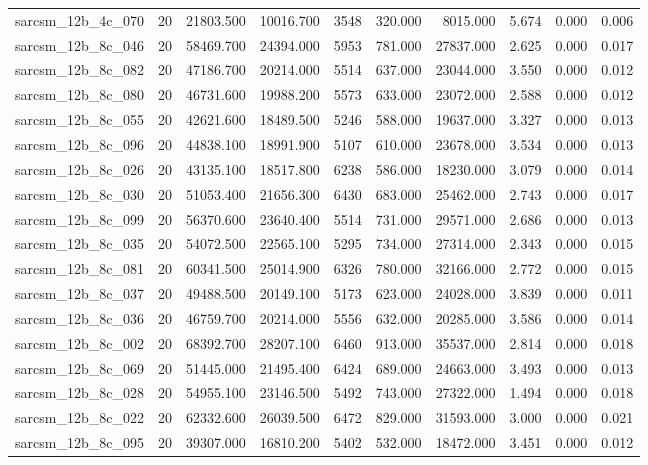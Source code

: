 \begin{tabular}{lrrrrrrrrr}
sarcsm\_12b\_4c\_070 & 20 & 21803.500 & 10016.700 & 3548 & 320.000 & 8015.000 & 5.674 & 0.000 & 0.006 \\
sarcsm\_12b\_8c\_046 & 20 & 58469.700 & 24394.000 & 5953 & 781.000 & 27837.000 & 2.625 & 0.000 & 0.017 \\
sarcsm\_12b\_8c\_082 & 20 & 47186.700 & 20214.000 & 5514 & 637.000 & 23044.000 & 3.550 & 0.000 & 0.012 \\
sarcsm\_12b\_8c\_080 & 20 & 46731.600 & 19988.200 & 5573 & 633.000 & 23072.000 & 2.588 & 0.000 & 0.012 \\
sarcsm\_12b\_8c\_055 & 20 & 42621.600 & 18489.500 & 5246 & 588.000 & 19637.000 & 3.327 & 0.000 & 0.013 \\
sarcsm\_12b\_8c\_096 & 20 & 44838.100 & 18991.900 & 5107 & 610.000 & 23678.000 & 3.534 & 0.000 & 0.013 \\
sarcsm\_12b\_8c\_026 & 20 & 43135.100 & 18517.800 & 6238 & 586.000 & 18230.000 & 3.079 & 0.000 & 0.014 \\
sarcsm\_12b\_8c\_030 & 20 & 51053.400 & 21656.300 & 6430 & 683.000 & 25462.000 & 2.743 & 0.000 & 0.017 \\
sarcsm\_12b\_8c\_099 & 20 & 56370.600 & 23640.400 & 5514 & 731.000 & 29571.000 & 2.686 & 0.000 & 0.013 \\
sarcsm\_12b\_8c\_035 & 20 & 54072.500 & 22565.100 & 5295 & 734.000 & 27314.000 & 2.343 & 0.000 & 0.015 \\
sarcsm\_12b\_8c\_081 & 20 & 60341.500 & 25014.900 & 6326 & 780.000 & 32166.000 & 2.772 & 0.000 & 0.015 \\
sarcsm\_12b\_8c\_037 & 20 & 49488.500 & 20149.100 & 5173 & 623.000 & 24028.000 & 3.839 & 0.000 & 0.011 \\
sarcsm\_12b\_8c\_036 & 20 & 46759.700 & 20214.000 & 5556 & 632.000 & 20285.000 & 3.586 & 0.000 & 0.014 \\
sarcsm\_12b\_8c\_002 & 20 & 68392.700 & 28207.100 & 6460 & 913.000 & 35537.000 & 2.814 & 0.000 & 0.018 \\
sarcsm\_12b\_8c\_069 & 20 & 51445.000 & 21495.400 & 6424 & 689.000 & 24663.000 & 3.493 & 0.000 & 0.013 \\
sarcsm\_12b\_8c\_028 & 20 & 54955.100 & 23146.500 & 5492 & 743.000 & 27322.000 & 1.494 & 0.000 & 0.018 \\
sarcsm\_12b\_8c\_022 & 20 & 62332.600 & 26039.500 & 6472 & 829.000 & 31593.000 & 3.000 & 0.000 & 0.021 \\
sarcsm\_12b\_8c\_095 & 20 & 39307.000 & 16810.200 & 5402 & 532.000 & 18472.000 & 3.451 & 0.000 & 0.012 \\

\end{tabular}

